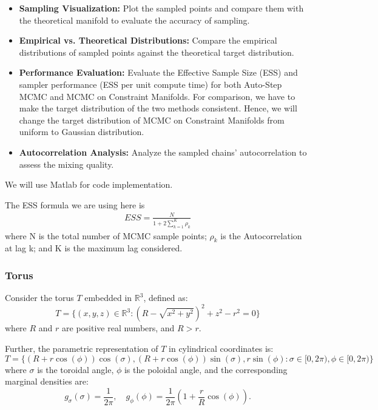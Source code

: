 \documentclass{article}
\begin{document}
\begin{itemize}
    \item \textbf{Sampling Visualization:} Plot the sampled points and compare them with the theoretical manifold to evaluate the accuracy of sampling.
    
    \item \textbf{Empirical vs. Theoretical Distributions:} Compare the empirical distributions of sampled points against the theoretical target distribution.
    
    \item \textbf{Performance Evaluation:} Evaluate the Effective Sample Size (ESS) and sampler performance (ESS per unit compute time) for both Auto-Step MCMC and MCMC on Constraint Manifolds. For comparison, we have to make the target distribution of the two methods consistent. Hence, we will change the target distribution of MCMC on Constraint Manifolds from uniform to Gaussian distribution.
    
    \item \textbf{Autocorrelation Analysis:} Analyze the sampled chains' autocorrelation to assess the mixing quality.
\end{itemize}

We will use Matlab for code implementation.

The ESS formula we are using here is 
\begin{align*}
    ESS= \frac{N}{1+ 2\sum_{k=1}^K \rho_k}
\end{align*}
where N is the total number of MCMC sample points; $\rho_k$ is the  Autocorrelation at lag k; and K is the maximum lag considered.

\subsubsection{Torus}
Consider the torus \(T\) embedded in \(\mathbb{R}^3\), defined as:
\[
T = \{(x, y, z) \in \mathbb{R}^3 : (R - \sqrt{x^2 + y^2})^2 + z^2 - r^2 = 0\}
\]
where \(R\) and \(r\) are positive real numbers, and \(R > r\).

Further, the parametric representation of \(T\) in cylindrical coordinates is:
\[
T = \{(R + r \cos(\phi))\cos(\sigma), (R + r \cos(\phi))\sin(\sigma), r \sin(\phi): \sigma \in [0, 2\pi), \phi \in [0, 2\pi)\}
\]
where \(\sigma\) is the toroidal angle, \(\phi\) is the poloidal angle, and the corresponding marginal densities are:
\[
g_\sigma(\sigma) = \frac{1}{2\pi}, \quad g_\phi(\phi) = \frac{1}{2\pi} \left(1 + \frac{r}{R} \cos(\phi)\right).
\]
\end{document}

